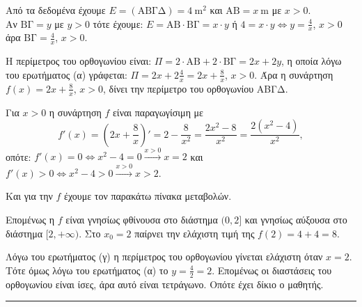 \begin{alist}
    \item Από τα δεδομένα έχουμε $E=(\text{ΑΒΓΔ}) = 4\ \text{m}^2$ και $\text{ΑΒ} = x\ \text{m}$ με $x>0$. \\
    Αν $\text{ΒΓ} = y$ με $y>0$ τότε έχουμε: $E = \text{ΑΒ} \cdot \text{ΒΓ} = x \cdot y$ ή $4=x \cdot y \Leftrightarrow y=\frac{4}{x}$, $x>0$ άρα $\text{ΒΓ} = \frac{4}{x}$, $x>0$.

    \item Η περίμετρος του ορθογωνίου είναι: $\Pi = 2 \cdot \text{ΑΒ} + 2 \cdot \text{ΒΓ} = 2x+2y$, η οποία λόγω του ερωτήματος (α) γράφεται: $\Pi = 2x+2\frac{4}{x} = 2x+\frac{8}{x}$, $x>0$. Άρα η συνάρτηση $f(x) = 2x+\frac{8}{x}$, $x>0$, δίνει την περίμετρο του ορθογωνίου ΑΒΓΔ.

    \item Για $x>0$ η συνάρτηση $f$ είναι παραγωγίσιμη με
    \[
        f'(x) = \left(2x+\frac{8}{x}\right)' = 2-\frac{8}{x^2} = \frac{2x^2-8}{x^2} = \frac{2(x^2-4)}{x^2},
    \]
    οπότε:
    $f'(x)=0 \Leftrightarrow x^2-4=0 \xrightarrow{x>0} x=2$ και $f'(x)>0 \Leftrightarrow x^2-4>0 \xrightarrow{x>0} x>2$.
    
    Και για την $f$ έχουμε τον παρακάτω πίνακα μεταβολών.
    \begin{center}
    \end{center}
    Επομένως η $f$ είναι γνησίως φθίνουσα στο διάστημα $(0, 2]$ και γνησίως αύξουσα στο διάστημα $[2, +\infty)$. Στο $x_0 = 2$ παίρνει την ελάχιστη τιμή της $f(2) = 4+4=8$.

    \item[δ)] Λόγω του ερωτήματος (γ) η περίμετρος του ορθογωνίου γίνεται ελάχιστη όταν $x = 2$. Τότε όμως λόγω του ερωτήματος (α) το $y = \frac{4}{2} = 2$. Επομένως οι διαστάσεις του ορθογωνίου είναι ίσες, άρα αυτό είναι τετράγωνο. Οπότε έχει δίκιο ο μαθητής.
\end{alist}
\vspace{6mm}
\noindent\rule{\textwidth}{0.4pt}
\vspace{6mm}

